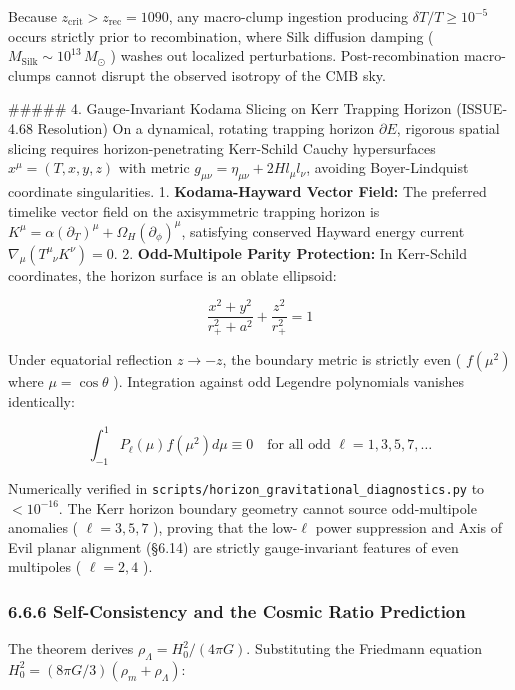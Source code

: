 \documentclass[11pt,a4paper]{article}
\theoremstyle{definition}
\theoremstyle{remark}
\begin{document}
Because $z_{\text{crit}} > z_{\text{rec}} = 1090$, any macro-clump ingestion producing $\delta T/T \ge 10^{-5}$ occurs strictly prior to recombination, where Silk diffusion damping ( $M_{\text{Silk}} \sim 10^{13} \, M_\odot$ ) washes out localized perturbations. Post-recombination macro-clumps cannot disrupt the observed isotropy of the CMB sky.

\#\#\#\#\# 4. Gauge-Invariant Kodama Slicing on Kerr Trapping Horizon (ISSUE-4.68 Resolution)
On a dynamical, rotating trapping horizon $\partial E$, rigorous spatial slicing requires horizon-penetrating Kerr-Schild Cauchy hypersurfaces $x^\mu = (T, x, y, z)$ with metric $g_{\mu\nu} = \eta_{\mu\nu} + 2 H l_\mu l_\nu$, avoiding Boyer-Lindquist coordinate singularities.
1. \textbf{Kodama-Hayward Vector Field:} The preferred timelike vector field on the axisymmetric trapping horizon is $K^\mu = \alpha (\partial_T)^\mu + \Omega_H (\partial_\phi)^\mu$, satisfying conserved Hayward energy current $\nabla_\mu (T^\mu_{\phantom{\mu}\nu} K^\nu) = 0$.
2. \textbf{Odd-Multipole Parity Protection:} In Kerr-Schild coordinates, the horizon surface is an oblate ellipsoid:


\begin{equation}
\frac{x^2 + y^2}{r_+^2 + a^2} + \frac{z^2}{r_+^2} = 1
\end{equation}


Under equatorial reflection $z \to -z$, the boundary metric is strictly even ( $f(\mu^2)$ where $\mu = \cos\theta$ ). Integration against odd Legendre polynomials vanishes identically:


\begin{equation}
\int_{-1}^1 P_\ell(\mu) f(\mu^2) d\mu \equiv 0 \quad \text{for all odd } \ell = 1, 3, 5, 7, \dots
\end{equation}


Numerically verified in \texttt{scripts/horizon_gravitational_diagnostics.py} to $< 10^{-16}$. The Kerr horizon boundary geometry cannot source odd-multipole anomalies ( $\ell = 3, 5, 7$ ), proving that the low-$\ell$ power suppression and Axis of Evil planar alignment (\S 6.14) are strictly gauge-invariant features of even multipoles ( $\ell = 2, 4$ ).

\subsubsection{6.6.6 Self-Consistency and the Cosmic Ratio Prediction}

The theorem derives $\rho_\Lambda = H_0^2 / (4\pi G)$. Substituting the Friedmann equation $H_0^2 = (8\pi G/3)(\rho_m + \rho_\Lambda)$:
\end{document}

